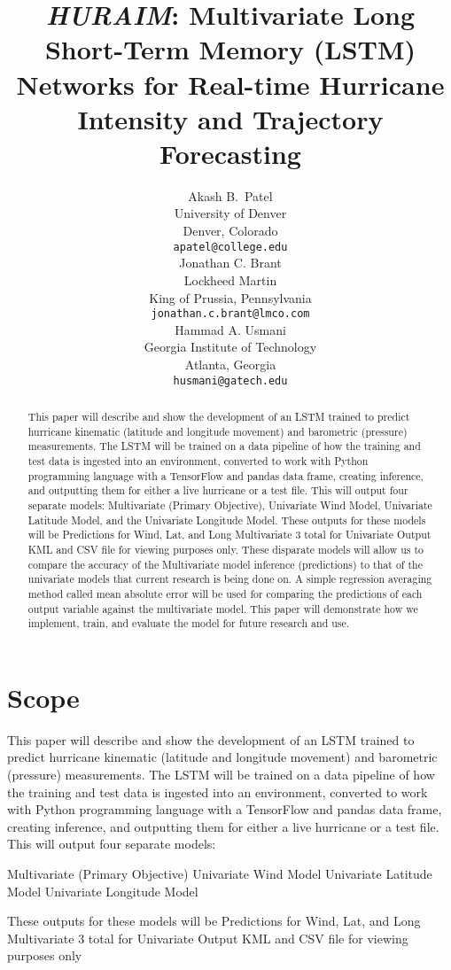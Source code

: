 \documentclass{article}
\title{\emph{HURAIM}: Multivariate Long Short-Term Memory (LSTM) Networks for Real-time Hurricane Intensity and Trajectory Forecasting}
\author{
	Akash B.~Patel \\
	University of Denver\\
	Denver, Colorado \\
	\texttt{apatel@college.edu} \\
	\And
	Jonathan C. Brant \\
	Lockheed Martin\\
	King  of Prussia, Pennsylvania \\
	\texttt{jonathan.c.brant@lmco.com} \\
	\And
	Hammad A. Usmani \\
	Georgia Institute of Technology\\
	Atlanta, Georgia \\
	\texttt{husmani@gatech.edu}
}
\begin{document}
\maketitle

\begin{abstract}
	This paper will describe and show the development of an LSTM trained to predict hurricane kinematic (latitude and longitude movement) and barometric (pressure) measurements. The LSTM will be trained on a data pipeline of how the training and test data is ingested into an environment, converted to work with Python programming language with a TensorFlow and pandas data frame, creating inference, and outputting them for either a live hurricane or a test file. This will output four separate models: Multivariate (Primary Objective), Univariate Wind Model, Univariate Latitude Model, and the Univariate Longitude Model. These outputs for these models will be Predictions for Wind, Lat, and Long Multivariate 3 total for Univariate Output KML and CSV file for viewing purposes only. These disparate models will allow us to compare the accuracy of the Multivariate model inference (predictions) to that of the univariate models that current research is being done on. A simple regression averaging method called mean absolute error will be used for comparing the predictions of each output variable against the multivariate model. This paper will demonstrate how we implement, train, and evaluate the model for future research and use.
\end{abstract}


\section{Scope}
This paper will describe and show the development of an LSTM trained to predict hurricane kinematic (latitude and longitude movement) and barometric (pressure) measurements. The LSTM will be trained on a data pipeline of how the training and test data is ingested into an environment, converted to work with Python programming language with a TensorFlow and pandas data frame, creating inference, and outputting them for either a live hurricane or a test file. This will output four separate models:

Multivariate (Primary Objective)
Univariate Wind Model
Univariate Latitude Model
Univariate Longitude Model

These outputs for these models will be 
Predictions for Wind, Lat, and Long
Multivariate
3 total for Univariate
Output KML and CSV file for viewing purposes only
\end{document}
